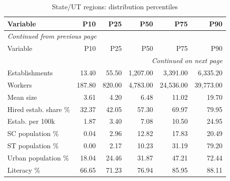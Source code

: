 \documentclass[11pt,a4paper]{report}
\begin{document}
\begingroup\footnotesize\setlength{\tabcolsep}{4pt}
\begin{longtable}{lrrrrr}
\caption{State/\allowbreak{}UT regions: distribution percentiles}\\\toprule
Variable & P10 & P25 & P50 & P75 & P90 \\\midrule\endfirsthead
\multicolumn{6}{l}{\textit{Continued from previous page}}\\\toprule
Variable & P10 & P25 & P50 & P75 & P90 \\\midrule\endhead
\midrule\multicolumn{6}{r}{\textit{Continued on next page}}\\\endfoot\bottomrule\endlastfoot
Establishments & 13.40 & 55.50 & 1,207.00 & 3,391.00 & 6,335.20 \\
Workers & 187.80 & 820.00 & 4,783.00 & 24,536.00 & 39,773.00 \\
Mean size & 3.61 & 4.20 & 6.48 & 11.02 & 19.70 \\
Hired estab. share \% & 32.37 & 42.05 & 57.30 & 69.97 & 79.95 \\
Estab. per 100k & 1.87 & 3.40 & 7.08 & 10.50 & 24.95 \\
SC population \% & 0.04 & 2.96 & 12.82 & 17.83 & 20.49 \\
ST population \% & 0.00 & 2.17 & 10.23 & 31.19 & 79.20 \\
Urban population \% & 18.04 & 24.46 & 31.87 & 47.21 & 72.44 \\
Literacy \% & 66.65 & 71.23 & 76.94 & 85.95 & 88.11 \\
\end{longtable}\endgroup
\begingroup\footnotesize\setlength{\tabcolsep}{4pt}
\end{document}
